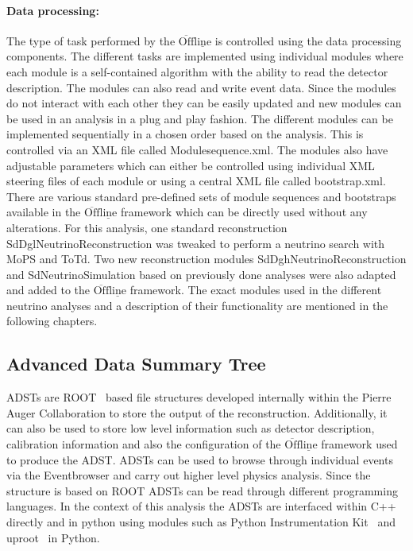 \paragraph*{Data processing:}
The type of task performed by the $\mathrm{\overline{Off}\underline{line}}$ is controlled using the data processing components. The different tasks are implemented using individual modules where each module is a self-contained algorithm with the ability to read the detector description. The modules can also read and write event data. Since the modules do not interact with each other they can be easily updated and new modules can be used in an analysis in a plug and play fashion. The different modules can be implemented sequentially in a chosen order based on the analysis. This is controlled via an XML file called Modulesequence.xml. The modules also have adjustable parameters which can either be controlled using individual XML steering files of each module or using a central XML file called bootstrap.xml. There are various standard pre-defined sets of module sequences and bootstraps available in the $\mathrm{\overline{Off}\underline{line}}$ framework which can be directly used without any alterations. For this analysis, one standard reconstruction SdDglNeutrinoReconstruction was tweaked to perform a neutrino search with MoPS and ToTd. Two new reconstruction modules SdDghNeutrinoReconstruction and SdNeutrinoSimulation based on previously done analyses were also adapted and added to the $\mathrm{\overline{Off}\underline{line}}$ framework. The exact modules used in the different neutrino analyses and a description of their functionality are mentioned in the following chapters.

\subsection{Advanced Data Summary Tree}
\label{sec:ADST}
\Glspl{ADST} are ROOT~\cite{Brun:1997pa} based file structures developed internally within the Pierre Auger Collaboration to store the output of the reconstruction. Additionally, it can also be used to store low level information such as detector description, calibration information and also the configuration of the $\mathrm{\overline{Off}\underline{line}}$ framework used to produce the ADST. ADSTs can be used to browse through individual events via the Eventbrowser and carry out higher level physics analysis. Since the structure is based on ROOT ADSTs can be read through different programming languages. In the context of this analysis the ADSTs are interfaced within C++ directly and in python using modules such as Python Instrumentation Kit~\cite{HDembinski_pyik} and uproot~\cite{Pivarski2024-za} in Python. 


